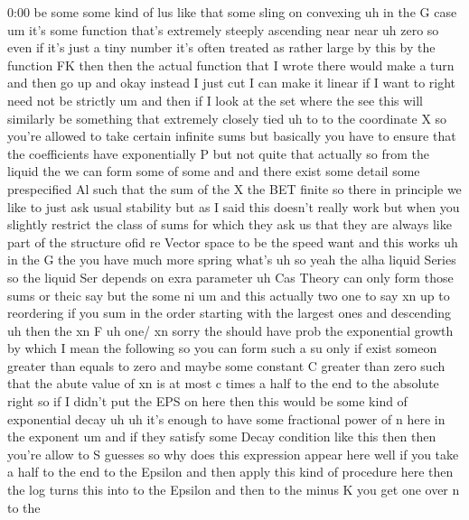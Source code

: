 \begin{unfinished}{0:00}
be  some  some  kind  of  lus  like
that  some  sling  on
convexing  uh  in  the  G
case
um  it's  some  function  that's  extremely
steeply  ascending
near  near  uh  zero  so  even  if  it's  just  a
tiny  number  it's  often  treated  as  rather
large  by  this  by  the  function  FK  then
then  the  actual
function  that  I  wrote  there  would  make  a
turn  and  then  go  up  and  okay  instead  I
just
cut  I  can  make  it  linear  if  I  want  to
right  need  not  be
strictly
um  and  then  if  I  look  at  the  set  where
the  see  this  will  similarly  be  something
that  extremely  closely
tied  uh  to  to  the  coordinate  X
so  you're  allowed  to  take  certain
infinite  sums  but  basically  you  have  to
ensure  that  the  coefficients  have
exponentially
P  but  not  quite  that  actually
so
from  the  liquid
the  we  can
form
some  of  some  and
and  there  exist  some  detail  some
prespecified
Al  such  that  the
sum  of  the  X  the
BET  finite  so
there  in  principle  we  like  to  just  ask
usual  stability  but  as  I  said  this
doesn't  really  work  but  when
you  slightly  restrict  the  class  of  sums
for  which  they  ask  us  that  they  are
always  like  part  of  the  structure  ofid
re  Vector  space  to  be  the  speed  want  and
this
works  uh  in  the  G  the  you  have  much  more
spring
what's  uh  so  yeah  the  alha  liquid  Series
so  the  liquid  Ser  depends  on  exra
parameter  uh  Cas
Theory  can  only  form  those
sums  or  theic  say  but  the
some  ni  um  and  this  actually  two  one  to
say
xn  up  to
reordering  if  you  sum  in  the  order
starting  with  the  largest  ones  and
descending  uh  then  the
xn  F
uh  one/
xn  sorry  the  should  have  prob  the
exponential  growth  by  which  I  mean  the
following
so  you  can  form  such  a  su  only  if  exist
someon  greater  than  equals  to  zero  and
maybe  some  constant  C  greater  than  zero
such  that  the  abute  value  of  xn  is  at
most  c
times  a  half  to  the  end  to  the
absolute  right  so  if  I  didn't  put  the
EPS  on  here  then  this  would  be  some  kind
of  exponential  decay
uh  uh  it's  enough  to  have  some
fractional  power  of  n  here  in  the
exponent  um  and  if  they  satisfy  some
Decay  condition  like  this  then  then
you're  allow  to  S
guesses  so  why  does  this  expression
appear  here  well  if  you  take  a  half  to
the  end  to  the  Epsilon  and  then  apply
this  kind  of  procedure  here  then  the  log
turns  this  into  to  the  Epsilon  and  then
to  the  minus  K  you  get  one  over  n  to  the

\end{unfinished}
